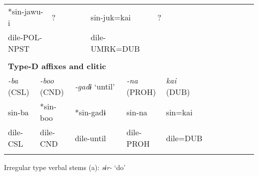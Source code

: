 \begin{tabularx}{\textwidth}{XXXXXXXXXXXXXXXXXXXXXX}
\multicolumn{4}{X}{{ *sin-jawu-i}} & \multicolumn{3}{X}{{ ?}} & \multicolumn{3}{X}{sin-juk=kai} & \multicolumn{4}{X}{{ ?}} & \multicolumn{8}{X}{}\\
\multicolumn{4}{X}{dile-POL-NPST} & \multicolumn{3}{X}{} & \multicolumn{3}{X}{dile-UMRK=DUB} & \multicolumn{4}{X}{} & \multicolumn{8}{X}{}\\
\multicolumn{22}{X}{}\\
\multicolumn{22}{X}{{\bfseries Type-D affixes and clitic}}\\
\multicolumn{3}{X}{{ \textit{{}-ba} (CSL)}} & \multicolumn{3}{X}{{ \textit{{}-boo} (CND)}} & \multicolumn{2}{X}{{ \textit{{}-gadɨ} ‘until’}} & \multicolumn{3}{X}{{ \textit{{}-na} (PROH)}} & \multicolumn{5}{X}{{ \textit{kai} (DUB)}} & \multicolumn{6}{X}{}\\
\multicolumn{3}{X}{{ sin-ba}} & \multicolumn{3}{X}{{ *sin-boo}} & \multicolumn{2}{X}{{ *sin-gadɨ}} & \multicolumn{3}{X}{{ sin-na}} & \multicolumn{5}{X}{{ sin=kai}} & \multicolumn{6}{X}{}\\
\multicolumn{3}{X}{dile-CSL} & \multicolumn{3}{X}{dile-CND} & \multicolumn{2}{X}{dile-until} & \multicolumn{3}{X}{dile-PROH} & \multicolumn{5}{X}{dile=DUB} & \multicolumn{6}{X}{}\\
\lspbottomrule
\end{tabularx}
Irregular type verbal stems (a): \textit{sɨr-} ‘do’

\tablefirsthead{}


